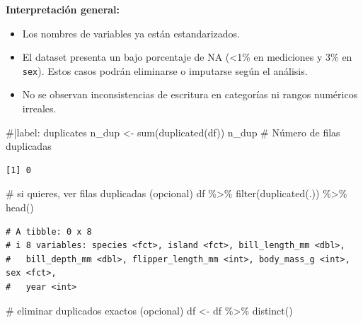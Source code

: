 \documentclass[
  spanish,
  11pt,
  a4paper,
  DIV=11,
  numbers=noendperiod]{scrartcl}
\newenvironment{Shaded}{\begin{snugshade}}{\end{snugshade}}
\newcommand{\CommentTok}[1]{\textcolor[rgb]{0.37,0.37,0.37}{#1}}
\newcommand{\FunctionTok}[1]{\textcolor[rgb]{0.28,0.35,0.67}{#1}}
\newcommand{\NormalTok}[1]{\textcolor[rgb]{0.00,0.23,0.31}{#1}}
\newcommand{\OtherTok}[1]{\textcolor[rgb]{0.00,0.23,0.31}{#1}}
\newcommand{\SpecialCharTok}[1]{\textcolor[rgb]{0.37,0.37,0.37}{#1}}
\begin{document}
\textbf{Interpretación general:}

\begin{itemize}
\item
  Los nombres de variables ya están estandarizados.
\item
  El dataset presenta un bajo porcentaje de NA (\textless1\% en
  mediciones y 3\% en \texttt{sex}). Estos casos podrán eliminarse o
  imputarse según el análisis.
\item
  No se observan inconsistencias de escritura en categorías ni rangos
  numéricos irreales.
\end{itemize}

\begin{Shaded}
\begin{Highlighting}[numbers=left,,]
\CommentTok{\#|label: duplicates}
\NormalTok{n\_dup }\OtherTok{\textless{}{-}} \FunctionTok{sum}\NormalTok{(}\FunctionTok{duplicated}\NormalTok{(df))}
\NormalTok{n\_dup }\CommentTok{\# Número de filas duplicadas}
\end{Highlighting}
\end{Shaded}

\begin{verbatim}
[1] 0
\end{verbatim}

\begin{Shaded}
\begin{Highlighting}[numbers=left,,]
\CommentTok{\# si quieres, ver filas duplicadas (opcional)}
\NormalTok{df }\SpecialCharTok{\%\textgreater{}\%} \FunctionTok{filter}\NormalTok{(}\FunctionTok{duplicated}\NormalTok{(.)) }\SpecialCharTok{\%\textgreater{}\%} \FunctionTok{head}\NormalTok{()}
\end{Highlighting}
\end{Shaded}

\begin{verbatim}
# A tibble: 0 x 8
# i 8 variables: species <fct>, island <fct>, bill_length_mm <dbl>,
#   bill_depth_mm <dbl>, flipper_length_mm <int>, body_mass_g <int>, sex <fct>,
#   year <int>
\end{verbatim}

\begin{Shaded}
\begin{Highlighting}[numbers=left,,]
\CommentTok{\# eliminar duplicados exactos (opcional)}
\NormalTok{df }\OtherTok{\textless{}{-}}\NormalTok{ df }\SpecialCharTok{\%\textgreater{}\%} \FunctionTok{distinct}\NormalTok{()}
\end{Highlighting}
\end{Shaded}
\end{document}
